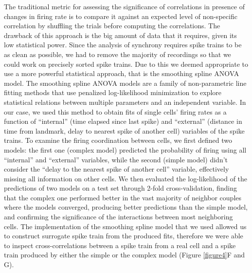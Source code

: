 The traditional metric for assessing the significance of correlations in presence of changes in firing rate is to compare it against an expected level of non-specific correlation by shuffling the trials before computing the correlations. The drawback of this approach is the big amount of data that it requires, given its low statistical power. Since the analysis of synchrony requires spike trains to be as clean as possible, we had to remove the majority of recordings so that we could work on precisely sorted spike trains.  Due to this we deemed appropriate to use a more powerful statistical approach, that is the smoothing spline ANOVA model. The smoothing spline ANOVA models \cite{gu2013smoothing} are a family of non-parametric line fitting methods that use penalized log-likelihood minimization to explore statistical relations between multiple parameters and an independent variable. In our case, we used this method to obtain fits of single cells’ firing rates as a function of “internal” (time elapsed since last spike) and “external” (distance in time from landmark, delay to nearest spike of another cell) variables of the spike trains. To examine the firing coordination between cells, we first defined two models: the first one (complex model) predicted the probability of firing using all “internal” and “external” variables, while the second (simple model) didn't consider the ``delay to the nearest spike of another cell'' variable, effectively missing all information on other cells. We then evaluated the log-likelihood of the predictions of two models on a test set through 2-fold cross-validation, finding that the complex one performed better in the vast majority of neighbor couples where the models converged, producing better predictions than the simple model, and confirming the significance of the interactions between most neighboring cells. The implementation of the smoothing spline model that we used \cite{gu2014smoothing} allowed us to construct surrogate spike train from the produced fits, therefore we were able to inspect cross-correlations between a spike train from a real cell and a spike train produced by either the simple or the complex model (Figure \ref{figure4}F and G). 

